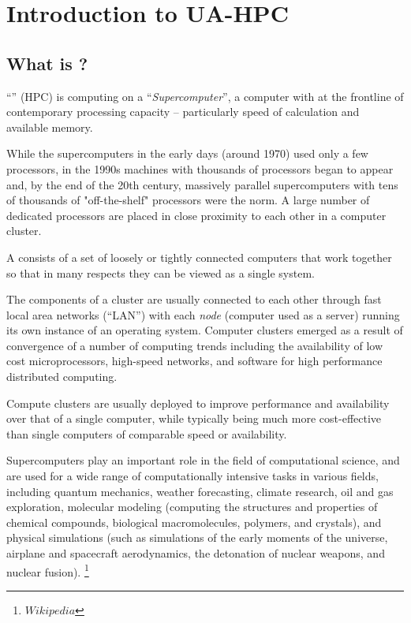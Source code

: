 \chapter{Introduction to UA-HPC}
\label{ch:introduction-to-hpc}

\section{What is \hpc?}
\label{sec:what-is-hpc}

``'' (HPC) is computing on a
``\emph{Supercomputer}'', a computer with at the frontline of contemporary
processing capacity -- particularly speed of calculation and available memory.

While the supercomputers in the early days (around 1970) used only a few
processors, in the 1990s machines with thousands of processors began to appear
and, by the end of the 20th century, massively parallel supercomputers with
tens of thousands of "off-the-shelf" processors were the norm. A large number
of dedicated processors are placed in close proximity to each other in a
computer cluster.

A  consists of a set of loosely or tightly connected
computers that work together so that in many respects they can be viewed as a
single system.

The components of a cluster are usually connected to each other through fast
local area networks (``LAN'') with each \emph{node} (computer used as a
server) running its own instance of an operating system. Computer clusters
emerged as a result of convergence of a number of computing trends including
the availability of low cost microprocessors, high-speed networks, and software
for high performance distributed computing.

Compute clusters are usually deployed to improve performance and availability
over that of a single computer, while typically being much more cost-effective
than single computers of comparable speed or availability.

Supercomputers play an important role in the field of computational science,
and are used for a wide range of computationally intensive tasks in various
fields, including quantum mechanics, weather forecasting, climate research, oil
and gas exploration, molecular modeling (computing the structures and
properties of chemical compounds, biological macromolecules, polymers, and
crystals), and physical simulations (such as simulations of the early moments
of the universe, airplane and spacecraft aerodynamics, the detonation of
nuclear weapons, and nuclear fusion). \footnote{ $ Wikipedia$ }

